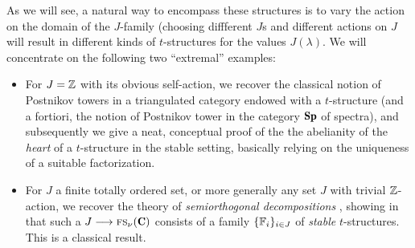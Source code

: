 As we will see, a natural way to encompass these structures is to vary the action on the domain of the $J$-family (choosing diffferent $J$s and different actions on $J$ will result in different kinds of $t$-structures for the values $J(\lambda)$. We will concentrate on the following two ``extremal'' examples:
\begin{itemize}
\item For $J=\mathbb{Z}$ with its obvious self-action, we recover the classical notion of Postnikov towers in a triangulated category endowed with a $t$-structure (and a fortiori, the notion of Postnikov tower in the category $\cate{Sp}$ of spectra), and subsequently we give a neat, conceptual proof of the the abelianity of the \emph{heart} of a $t$-structure in the stable setting, basically relying on the uniqueness of a suitable factorization. 

\item For $J$ a finite totally ordered set, or more generally any set $J$ with trivial $\mathbb{Z}$-action, we recover the theory of \emph{semiorthogonal decompositions} \cite{Bondal1995, Kuz}, showing in \athm {} that such a $J\to \fs_\nu(\C)$ consists of a family $\{\mathbb{F}_i\}_{i\in J}$ of \emph{stable} $t$-structures. This is a classical result.
\end{itemize}